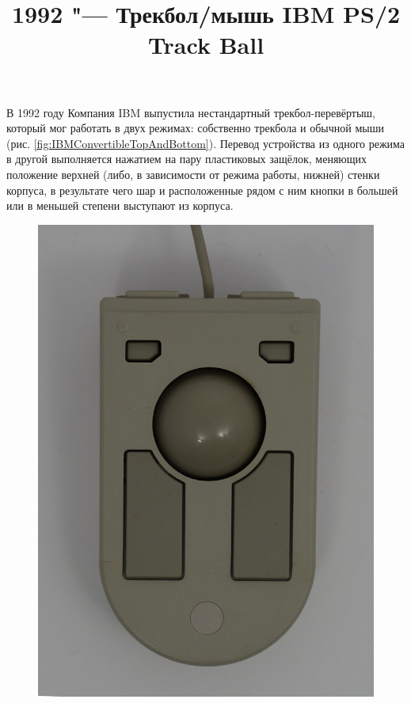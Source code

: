 \documentclass[11pt, a4paper]{article}
\begin{document}
\title{1992 "--- Трекбол/мышь IBM PS/2 Track Ball}
\date{}
\maketitle
В 1992 году Компания IBM выпустила нестандартный трекбол-перевёртыш, который мог работать в двух режимах: собственно трекбола и обычной мыши (рис. \ref{fig:IBMConvertibleTopAndBottom}). Перевод устройства из одного режима в другой выполняется нажатием на пару пластиковых защёлок, меняющих положение верхней (либо, в зависимости от режима работы, нижней) стенки корпуса, в результате чего шар и расположенные рядом с ним кнопки в большей или в меньшей степени выступают из корпуса.

\begin{figure}[h]
    \centering
    \includegraphics[scale=0.5]{1992_ibm_convertible/2.12.JPG}

\end{figure}
\end{document}
